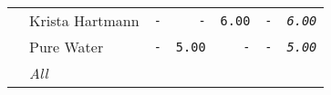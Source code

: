 \documentclass[11pt,A4paper,]{article}
\begin{document}
\begin{longtable}[]{@{}llrrrrr@{}}
\begin{minipage}[t]{0.14\columnwidth}
\strut
\end{minipage} & \begin{minipage}[t]{0.14\columnwidth}\raggedright\strut
Krista Hartmann\strut
\end{minipage} & \begin{minipage}[t]{0.14\columnwidth}\raggedleft\strut
\texttt{-}\strut
\end{minipage} & \begin{minipage}[t]{0.14\columnwidth}\raggedleft\strut
\texttt{-}\strut
\end{minipage} & \begin{minipage}[t]{0.14\columnwidth}\raggedleft\strut
\texttt{6.00}\strut
\end{minipage} & \begin{minipage}[t]{0.14\columnwidth}\raggedleft\strut
\texttt{-}\strut
\end{minipage} & \begin{minipage}[t]{0.14\columnwidth}\raggedleft\strut
\emph{\texttt{6.00}}\strut
\end{minipage}\tabularnewline
\begin{minipage}[t]{0.14\columnwidth}\raggedright\strut
\strut
\end{minipage} & \begin{minipage}[t]{0.14\columnwidth}\raggedright\strut
Pure Water\strut
\end{minipage} & \begin{minipage}[t]{0.14\columnwidth}\raggedleft\strut
\texttt{-}\strut
\end{minipage} & \begin{minipage}[t]{0.14\columnwidth}\raggedleft\strut
\texttt{5.00}\strut
\end{minipage} & \begin{minipage}[t]{0.14\columnwidth}\raggedleft\strut
\texttt{-}\strut
\end{minipage} & \begin{minipage}[t]{0.14\columnwidth}\raggedleft\strut
\texttt{-}\strut
\end{minipage} & \begin{minipage}[t]{0.14\columnwidth}\raggedleft\strut
\emph{\texttt{5.00}}\strut
\end{minipage}\tabularnewline
\begin{minipage}[t]{0.14\columnwidth}\raggedright\strut
\strut
\end{minipage} & \begin{minipage}[t]{0.14\columnwidth}\raggedright\strut
\emph{All}\strut
\end{minipage} & \begin{minipage}[t]{0.14\columnwidth}\raggedleft\strut

\end{minipage}
\end{longtable}
\end{document}
